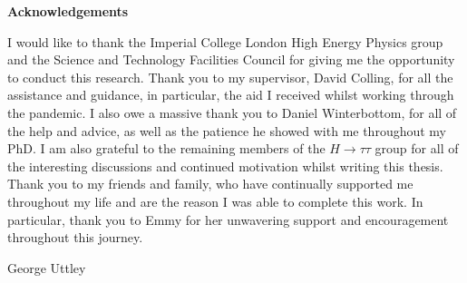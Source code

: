 \begin{titlepage}
\newpage


\vspace*{\fill}
\begin{adjustwidth}{1cm}{1cm}
\begin{center}
\Large \textbf{Acknowledgements}
\vspace{0.5cm}
\end{center}

I would like to thank the Imperial College London High Energy Physics group and the Science and Technology Facilities Council for giving me the opportunity to conduct this research.
Thank you to my supervisor, David Colling, for all the assistance and guidance, in particular, the aid I received whilst working through the pandemic.
I also owe a massive thank you to Daniel Winterbottom, for all of the help and advice, as well as the patience he showed with me throughout my PhD.
I am also grateful to the remaining members of the $H\rightarrow\tau\tau$ group for all of the interesting discussions and continued motivation whilst writing this thesis.
Thank you to my friends and family, who have continually supported me throughout my life and are the reason I was able to complete this work.
In particular, thank you to Emmy for her unwavering support and encouragement throughout this journey.

\begin{FlushRight}
George Uttley
\end{FlushRight}
\end{adjustwidth}
\vspace*{\fill}

\end{titlepage}